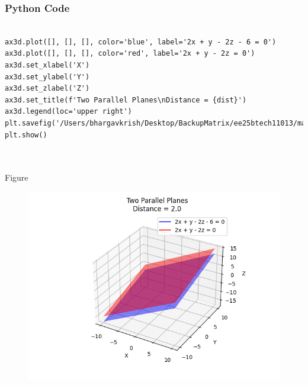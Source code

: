 \documentclass{beamer}
\begin{document}
\begin{frame}[fragile]
    \frametitle{Python Code }

    \begin{lstlisting}

ax3d.plot([], [], [], color='blue', label='2x + y - 2z - 6 = 0')
ax3d.plot([], [], [], color='red', label='2x + y - 2z = 0')
ax3d.set_xlabel('X')
ax3d.set_ylabel('Y')
ax3d.set_zlabel('Z')
ax3d.set_title(f'Two Parallel Planes\nDistance = {dist}')
ax3d.legend(loc='upper right')
plt.savefig('/Users/bhargavkrish/Desktop/BackupMatrix/ee25btech11013/matgeo/4.6.1/figs/Figure_1.png')
plt.show()



    \end{lstlisting}
\end{frame}



\begin{frame}{Figure}
\begin{figure}[h!]
    \centering
    \includegraphics[height=0.5\textheight, keepaspectratio]{figs/Figure_1.png}
\end{figure}
\end{frame}
\end{document}
